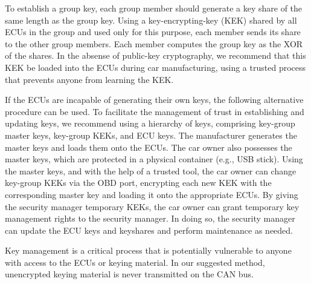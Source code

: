 To establish a group key, each group member should generate a key share of the same length as the group key.
Using a key-encrypting-key (KEK) shared by all ECUs in the group and used only for this purpose, 
each member sends its share to the other group members.  Each member computes the group key as the
XOR of the shares.  In the absense of public-key cryptography, we recommend that this KEK be
loaded into the ECUs during car manufacturing, using a trusted process that prevents anyone from
learning the KEK.

If the ECUs are incapable of generating their own keys, the following alternative procedure can
be used.  To facilitate the management of trust in establishing and updating keys, we recommend using a
hierarchy of keys, comprising key-group master keys, key-group KEKs, and ECU keys.
The manufacturer generates the master keys and loads them onto the ECUs.  
The car owner also possesses the master keys, which are
protected in a physical container (e.g., USB stick).  Using the master keys, 
and with the help of a trusted tool, the car owner can
change key-group KEKs via the OBD port, encrypting each new KEK with the corresponding master key
and loading it onto the appropriate ECUs.  By giving the security manager temporary KEKs, 
the car owner can grant temporary key management rights to the security manager.  In doing
so, the security manager can update the ECU keys and keyshares and perform maintenance
as needed.

Key management is a critical process that is potentially vulnerable to anyone with 
access to the ECUs or keying material.  In our suggested method, unencrypted keying material is never
transmitted on the CAN bus.




